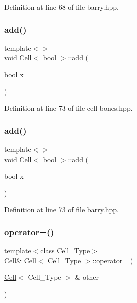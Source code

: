Definition at line 68 of file barry.\+hpp.

\mbox{\label{class_cell_a0da6d3d39069cc22486442cc51c7685c}} 
\subsubsection{\texorpdfstring{add()}{add()}\hspace{0.1cm}{\footnotesize\ttfamily [8/9]}}
{\footnotesize\ttfamily template$<$$>$ \\
void \hyperlink{class_cell}{Cell}$<$ bool $>$\+::add (\begin{DoxyParamCaption}\item[{bool}]{x }\end{DoxyParamCaption})\hspace{0.3cm}{\ttfamily [inline]}}



Definition at line 73 of file cell-\/bones.\+hpp.

\mbox{\label{class_cell_a0da6d3d39069cc22486442cc51c7685c}} 
\subsubsection{\texorpdfstring{add()}{add()}\hspace{0.1cm}{\footnotesize\ttfamily [9/9]}}
{\footnotesize\ttfamily template$<$$>$ \\
void \hyperlink{class_cell}{Cell}$<$ bool $>$\+::add (\begin{DoxyParamCaption}\item[{bool}]{x }\end{DoxyParamCaption})\hspace{0.3cm}{\ttfamily [inline]}}



Definition at line 73 of file barry.\+hpp.

\mbox{\label{class_cell_acf4bbf136ed394887c35cfd4e78f50b9}} 
\subsubsection{\texorpdfstring{operator=()}{operator=()}\hspace{0.1cm}{\footnotesize\ttfamily [1/2]}}
{\footnotesize\ttfamily template$<$class Cell\+\_\+\+Type$>$ \\
\hyperlink{class_cell}{Cell}\& \hyperlink{class_cell}{Cell}$<$ Cell\+\_\+\+Type $>$\+::operator= (\begin{DoxyParamCaption}\item[{\hyperlink{class_cell}{Cell}$<$ Cell\+\_\+\+Type $>$ \&}]{other }\end{DoxyParamCaption})\hspace{0.3cm}{\ttfamily [inline]}}



